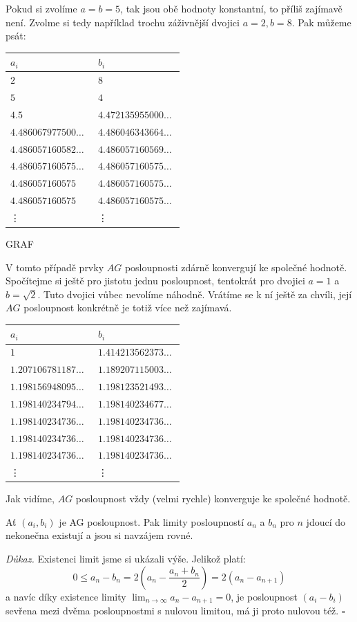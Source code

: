 \documentclass[12pt]{report}
\begin{document}
Pokud si zvolíme $a=b=5$, tak jsou obě hodnoty konstantní, to příliš zajímavě není. Zvolme si tedy například trochu záživnější dvojici $a = 2, b = 8$. Pak můžeme psát:


\begin{longtable}[H]{>{\raggedright\arraybackslash}p{0.3\linewidth}p{0.202\linewidth}}
\toprule
$a_i$ & $b_i$\\
\midrule
$2$ & \noindent $8$\\
$5$ & \noindent $4$\\
$ 4.5$ & $4.472135955000\dots$\\
$4.486067977500\dots$ & $4.486046343664\dots$\\
$4.486057160582\dots$ & $4.486057160569\dots$\\ 
$4.486057160575\dots$ & $4.486057160575\dots$\\
$4.486057160575$ & $4.486057160575\dots$\\
$4.486057160575$ & $4.486057160575\dots$\\
\vdots & \vdots\\
\bottomrule 
\end{longtable}
GRAF

V tomto případě prvky $AG$ posloupnosti zdárně konvergují ke společné hodnotě. Spočítejme si ještě pro jistotu jednu posloupnost, tentokrát pro dvojici $a=1$ a $b=\sqrt{2}$. Tuto dvojici vůbec nevolíme náhodně. Vrátíme se k ní ještě za chvíli, její $AG$ posloupnost konkrétně je totiž více než zajímavá.

\begin{longtable}[H]{>{\raggedright\arraybackslash}p{0.3\linewidth}p{0.202\linewidth}}
\toprule
$a_i$ & $b_i$\\
\midrule
$1$ & $1.414213562373\dots$\\
$1.207106781187\dots$ & $1.189207115003\dots$\\
$1.198156948095\dots$ & $1.198123521493\dots$\\
$1.198140234794\dots$ & $1.198140234677\dots$\\
$1.198140234736\dots$ & $1.198140234736\dots$\\
$1.198140234736\dots$&  $1.198140234736\dots$\\
$1.198140234736\dots$&  $1.198140234736\dots$\\
\vdots & \vdots\\
\bottomrule 
\end{longtable}

Jak vidíme, $AG$ posloupnost vždy (velmi rychle) konverguje ke společné hodnotě.
\begin{veta}\label{conv}
Ať $(a_i,b_i)$ je AG posloupnost. Pak limity posloupností $a_n$ a $b_n$ pro $n$ jdoucí do nekonečna existují a jsou si navzájem rovné. 
\end{veta}
\noindent \textit{Důkaz.} Existenci limit jsme si ukázali výše. Jelikož platí:
$$ 0 \leqslant a_n - b_n  =  2 \left( a_n - \frac{a_n+ b_n}{2} \right) = 2 ( a_{n} - a_{n+1} )$$
a navíc díky existence limity $\lim_{n \rightarrow \infty} a_n - a_{n+1} = 0$, je posloupnost $(a_i-b_i)$ sevřena mezi dvěma posloupnostmi s nulovou limitou, má ji proto nulovou též. \hfill $\square$
\end{document}
